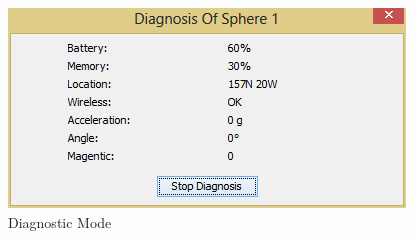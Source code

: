 \begin{figure}[H]
	\centering
	\includegraphics[scale=0.7]{img/diagnosticMode}
	\caption{Diagnostic Mode \label{fig:diagnosticMode}}
\end{figure}